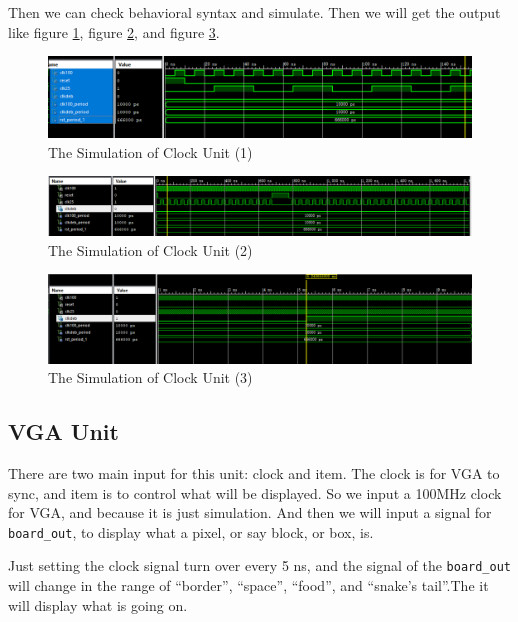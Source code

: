 \documentclass{article}
\begin{document}
    Then we can check behavioral syntax and simulate. Then we will get the output like figure \ref{fig:homework3-1},
    figure \ref{fig:homework3-2}, and figure \ref{fig:homework3-3}.
    
    \begin{figure}[h]
      \centering
      \includegraphics[width=1\linewidth]{homework3-1}
      \caption{The Simulation of Clock Unit (1)}
      \label{fig:homework3-1}
    \end{figure}
    \begin{figure}[h]
      \centering
      \includegraphics[width=1\linewidth]{homework3-2}
      \caption{The Simulation of Clock Unit (2)}
      \label{fig:homework3-2}
    \end{figure}
    \begin{figure}[h]
      \centering
      \includegraphics[width=1\linewidth]{homework3-3}
      \caption{The Simulation of Clock Unit (3)}
      \label{fig:homework3-3}
    \end{figure}

    \subsection{VGA Unit}
    \label{sec:ps:vgaunit}

    There are two main input for this unit: clock and item. The clock is for VGA to sync, 
    and item is to control what will be displayed.
    So we input a 100MHz clock for VGA, and because it is just simulation. And then we will input a signal for \verb|board_out|,
    to display what a pixel, or say block, or box, is.

    Just setting the clock signal turn over every 5 ns, and the signal of the \verb|board_out| will change in the range of
    ``border'', ``space'', ``food'', and ``snake's tail''.The it will display what is going on.
\end{document}
